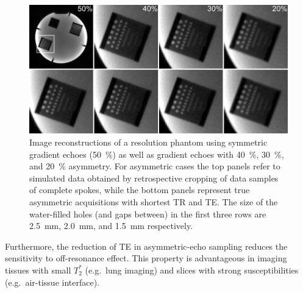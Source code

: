 \begin{figure}[tb]
  \centering
  \includegraphics[width=\textwidth]{fig/asym-echo-spatialRes.png}
  \caption{Image reconstructions of a resolution phantom using symmetric gradient echoes (\SI{50}{\percent}) as well as gradient echoes with \SI{40}{\percent}, \SI{30}{\percent}, and \SI{20}{\percent} asymmetry. For asymmetric cases the top panels refer to simulated data obtained by retrospective cropping of data samples of complete spokes, while the bottom panels represent true asymmetric acquisitions with shortest TR and TE. The size of the water-filled holes (and gaps between) in the first three rows are \SI{2.5}{\mm}, \SI{2.0}{\mm}, and \SI{1.5}{\mm} respectively.} \label{Fig:aysm-echo-spatialRes}
\end{figure}

Furthermore, the reduction of TE in asymmetric-echo sampling reduces the sensitivity to off-resonance effect. This property is advantageous in imaging tissues with small $T_2^*$ (e.g.~lung imaging) and slices with strong susceptibilities (e.g.~air-tissue interface). 

